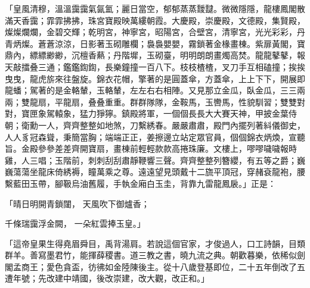 \begin{showcontents}{}
「皇風清穆，溫溫靄靄氣氤氳；麗日當空，郁郁蒸蒸靉靆。微微隱隱，龍樓鳳閣散滿天香靄；霏霏拂拂，珠宮寶殿映萬縷朝霞。大慶殿，崇慶殿，文德殿，集賢殿，燦燦爛爛，金碧交輝；乾明宮，神寧宮，昭陽宮，合壁宮，清寧宮，光光彩彩，丹青炳燦。蒼蒼涼涼，日影著玉砌雕欄；裊裊嬰嬰，霧鎖著金椽畫棟。紫扉黃閣，寶鼎內，縹縹緲緲，沉檀香爇；丹階墀，玉砌臺，明明朗朗畫燭高焚。龍龍鼕鼕，報天敲擂叠三通；鑑鑑鍧鍧，長樂鐘撞一百八下。枝枝楂楂，叉刀手互相磕撞；挨挨曳曳，龍虎旂來往盤旋。錦衣花帽，擎著的是圓蓋傘，方蓋傘，上上下下，開展即龍蟠；駕著的是金輅輦，玉輅輦，左左右右相陣。又見那立金瓜，臥金瓜，三三兩兩；雙龍扇，平龍扇，叠叠重重。群群隊隊，金鞍馬，玉轡馬，性貌馴習；雙雙對對，寶匣象駕轅象，猛力猙獰。鎮殿將軍，一個個長長大大賽天神，甲披金葉侍朝；衛勳一人，齊齊整整如地煞，刀繫綉春。嚴嚴肅肅，殿門內擺列著紏儀御史，人人豸冠森聳，秉簡當胸；端端正正，姜擦邊立站定眾官員，個個錦衣炳煥，宣聽旨。金殿參參差差齊開寶扇，畫棟前輕輕款款高捲珠廉。文樓上，嘐嘐噦噦報時雞，人三唱；玉階前，刺刺刮刮肅靜鞭響三聲。齊齊整整列簪纓，有五等之爵；巍巍蕩蕩坐龍床倚綉褥，瞳萬乘之尊。遠遠望見頭戴十二旒平頂冠，穿赭袞龍袍，腰繫藍田玉帶，腳靸烏油舊履，手執金廂白玉圭，背靠九雷龍鳳扆。」正是：

「晴日明開青鎖闥，  天風吹下御爐香；

千條瑞靄浮金闕，  一朵紅雲捧玉皇。」

「這帝皇果生得堯眉舜目，禹背湯肩。若說這個官家，才俊過人，口工詩韻，目類群羊。善寫墨君竹，能揮薛稷書。道三教之書，曉九流之典。朝歡暮樂，依稀似劍閣孟商王；愛色貪盃，彷彿如金陸陳後主。從十八歲登基即位，二十五年倒改了五遭年號；先改建中靖國，後改崇建，改大觀，改正和。」


\end{showcontents}
